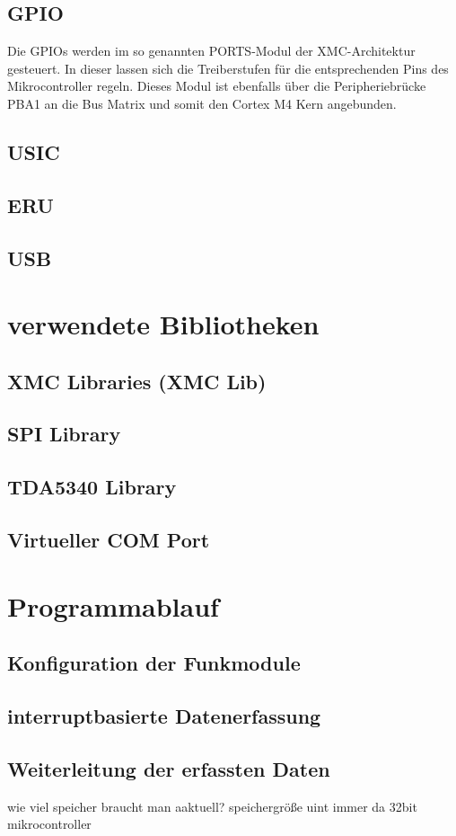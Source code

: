 \subsection{GPIO}
Die \acp{GPIO} werden im so genannten PORTS-Modul der XMC-Architektur gesteuert. In dieser lassen sich die Treiberstufen für die entsprechenden Pins des Mikrocontroller regeln. Dieses Modul ist ebenfalls über die Peripheriebrücke PBA1 an die Bus Matrix und somit den Cortex M4 Kern angebunden.  %

\subsection{USIC}
\subsection{ERU}
\subsection{USB}
\section{verwendete Bibliotheken}
\subsection{XMC Libraries (XMC Lib)}
\subsection{SPI Library}
\subsection{TDA5340 Library}
\subsection{Virtueller COM Port}
\section{Programmablauf}
\subsection{Konfiguration der Funkmodule}
\subsection{interruptbasierte Datenerfassung}
\subsection{Weiterleitung der erfassten Daten}
wie viel speicher braucht man aaktuell?
speichergröße uint immer da 32bit mikrocontroller